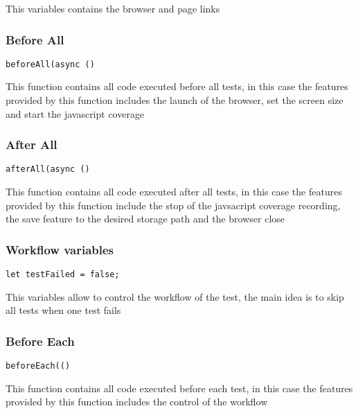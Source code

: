 \documentclass[a4paper]{article}
\begin{document}
This variables contains the browser and page links

\hypertarget{toc263}{}
\subsubsection{Before All}

\begin{lstlisting}
beforeAll(async ()
\end{lstlisting}

This function contains all code executed before all tests, in this case the
features provided by this function includes the launch of the browser, set
the screen size and start the javascript coverage

\hypertarget{toc264}{}
\subsubsection{After All}

\begin{lstlisting}
afterAll(async ()
\end{lstlisting}

This function contains all code executed after all tests, in this case the
features provided by this function include the stop of the javsacript coverage
recording, the save feature to the desired storage path and the browser close

\hypertarget{toc265}{}
\subsubsection{Workflow variables}

\begin{lstlisting}
let testFailed = false;
\end{lstlisting}

This variables allow to control the workflow of the test, the main idea is to
skip all tests when one test fails

\hypertarget{toc266}{}
\subsubsection{Before Each}

\begin{lstlisting}
beforeEach(()
\end{lstlisting}

This function contains all code executed before each test, in this case the
features provided by this function includes the control of the workflow
\end{document}

